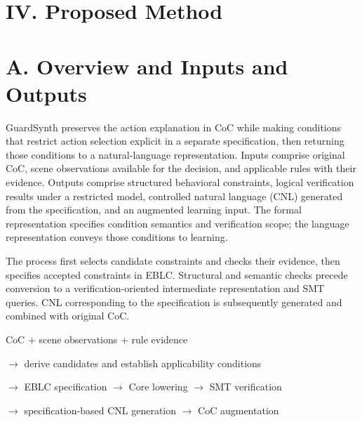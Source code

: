 \documentclass[11pt,a4paper]{article}
\begin{document}
\section*{IV. Proposed Method}


\section*{A. Overview and Inputs and Outputs}

GuardSynth preserves the action explanation in CoC while making conditions that restrict action selection explicit in a separate specification, then returning those conditions to a natural-language representation. Inputs comprise original CoC, scene observations available for the decision, and applicable rules with their evidence. Outputs comprise structured behavioral constraints, logical verification results under a restricted model, controlled natural language (CNL) generated from the specification, and an augmented learning input. The formal representation specifies condition semantics and verification scope; the language representation conveys those conditions to learning.\par

The process first selects candidate constraints and checks their evidence, then specifies accepted constraints in EBLC. Structural and semantic checks precede conversion to a verification-oriented intermediate representation and SMT queries. CNL corresponding to the specification is subsequently generated and combined with original CoC.\par

\begingroup\small\ttfamily\setlength{\parskip}{1pt}
\noindent\hspace*{0.0em}CoC + scene observations + rule evidence\par
\noindent\hspace*{1.0em}\ensuremath{\rightarrow} derive candidates and establish applicability conditions\par
\noindent\hspace*{1.0em}\ensuremath{\rightarrow} EBLC specification \ensuremath{\rightarrow} Core lowering \ensuremath{\rightarrow} SMT verification\par
\noindent\hspace*{1.0em}\ensuremath{\rightarrow} specification-based CNL generation \ensuremath{\rightarrow} CoC augmentation\par\endgroup\par
\end{document}
